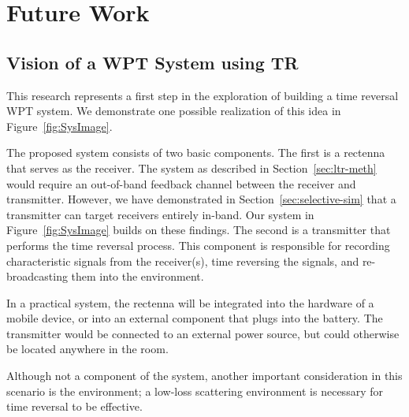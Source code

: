 \chapter{Future Work}
\label{ch:future}


\section{Vision of a WPT System using TR}
\label{sec:future-roadmap}
This research represents a first step in the exploration of building a
time reversal WPT system.
%
We demonstrate one possible realization of this idea in Figure~\ref{fig:SysImage}.


The proposed system consists of two basic components.
%
The first is a rectenna that serves as the receiver.
%
The system as described in Section~\ref{sec:ltr-meth} would require an
out-of-band feedback channel between the receiver and transmitter. However, we
have demonstrated in Section~\ref{sec:selective-sim} that a transmitter can target
receivers entirely in-band.
%
Our system in Figure~\ref{fig:SysImage} builds on these findings.
%
The second is a transmitter that performs the time reversal process.
%
This component is responsible for recording characteristic signals from the
receiver(s), time reversing the signals, and re-broadcasting them into the
environment.



In a practical system, the rectenna will be integrated into the hardware of a
mobile device, or into an external component that plugs into the battery.
%
The transmitter would be connected to an external power source, but
could otherwise be located anywhere in the room.

Although not a component of the system, another important consideration in this
scenario is the environment; a low-loss scattering environment is necessary for
time reversal to be effective.

